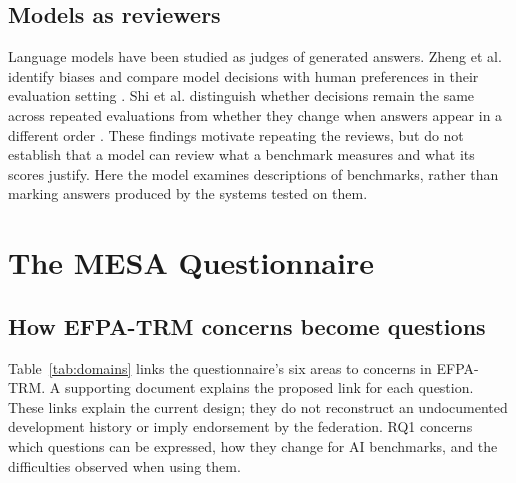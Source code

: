 \documentclass[10pt,conference]{IEEEtran}
\begin{document}
\subsection{Models as reviewers}
Language models have been studied as judges of generated answers. Zheng et al. identify biases and compare model decisions with human preferences in their evaluation setting \cite{zheng_llm_judge_2023}. Shi et al. distinguish whether decisions remain the same across repeated evaluations from whether they change when answers appear in a different order \cite{shi_judging_judges_2025}. These findings motivate repeating the reviews, but do not establish that a model can review what a benchmark measures and what its scores justify. Here the model examines descriptions of benchmarks, rather than marking answers produced by the systems tested on them.

\section{The MESA Questionnaire}
\subsection{How EFPA-TRM concerns become questions}
Table~\ref{tab:domains} links the questionnaire's six areas to concerns in EFPA-TRM. A supporting document explains the proposed link for each question. These links explain the current design; they do not reconstruct an undocumented development history or imply endorsement by the federation. RQ1 concerns which questions can be expressed, how they change for AI benchmarks, and the difficulties observed when using them.
\end{document}
